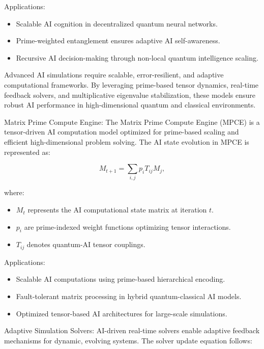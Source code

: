 Applications:
\begin{itemize}
    \item Scalable AI cognition in decentralized quantum neural networks.
    \item Prime-weighted entanglement ensures adaptive AI self-awareness.
    \item Recursive AI decision-making through non-local quantum intelligence scaling.
\end{itemize}



\pa Advanced AI simulations require scalable, error-resilient, and adaptive computational frameworks. By leveraging prime-based tensor dynamics, real-time feedback solvers, and multiplicative eigenvalue stabilization, these models ensure robust AI performance in high-dimensional quantum and classical environments.

\pa Matrix Prime Compute Engine: The Matrix Prime Compute Engine (MPCE) is a tensor-driven AI computation model optimized for prime-based scaling and efficient high-dimensional problem solving. The AI state evolution in MPCE is represented as:

\begin{equation}
M_{t+1} = \sum_{i,j} p_i T_{ij} M_j,
\end{equation}

where:
\begin{itemize}
    \item $M_t$ represents the AI computational state matrix at iteration $t$.
    \item $p_i$ are prime-indexed weight functions optimizing tensor interactions.
    \item $T_{ij}$ denotes quantum-AI tensor couplings.
\end{itemize}

Applications:
\begin{itemize}
    \item Scalable AI computations using prime-based hierarchical encoding.
    \item Fault-tolerant matrix processing in hybrid quantum-classical AI models.
    \item Optimized tensor-based AI architectures for large-scale simulations.
\end{itemize}

\pa Adaptive Simulation Solvers: AI-driven real-time solvers enable adaptive feedback mechanisms for dynamic, evolving systems. The solver update equation follows:

